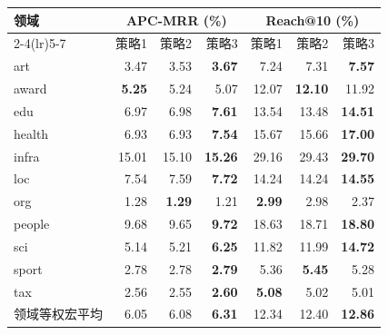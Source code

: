 \begin{tabular}{lrrrrrr}
\toprule
领域 & \multicolumn{3}{c}{APC-MRR (\%)} & \multicolumn{3}{c}{Reach@10 (\%)} \\
\cmidrule(lr){2-4}\cmidrule(lr){5-7}
 & 策略1 & 策略2 & 策略3 & 策略1 & 策略2 & 策略3 \\
\midrule
art & 3.47 & 3.53 & \textbf{3.67} & 7.24 & 7.31 & \textbf{7.57} \\
award & \textbf{5.25} & 5.24 & 5.07 & 12.07 & \textbf{12.10} & 11.92 \\
edu & 6.97 & 6.98 & \textbf{7.61} & 13.54 & 13.48 & \textbf{14.51} \\
health & 6.93 & 6.93 & \textbf{7.54} & 15.67 & 15.66 & \textbf{17.00} \\
infra & 15.01 & 15.10 & \textbf{15.26} & 29.16 & 29.43 & \textbf{29.70} \\
loc & 7.54 & 7.59 & \textbf{7.72} & 14.24 & 14.24 & \textbf{14.55} \\
org & 1.28 & \textbf{1.29} & 1.21 & \textbf{2.99} & 2.98 & 2.37 \\
people & 9.68 & 9.65 & \textbf{9.72} & 18.63 & 18.71 & \textbf{18.80} \\
sci & 5.14 & 5.21 & \textbf{6.25} & 11.82 & 11.99 & \textbf{14.72} \\
sport & 2.78 & 2.78 & \textbf{2.79} & 5.36 & \textbf{5.45} & 5.28 \\
tax & 2.56 & 2.55 & \textbf{2.60} & \textbf{5.08} & 5.02 & 5.01 \\
\midrule
领域等权宏平均 & 6.05 & 6.08 & \textbf{6.31} & 12.34 & 12.40 & \textbf{12.86} \\
\bottomrule
\end{tabular}

